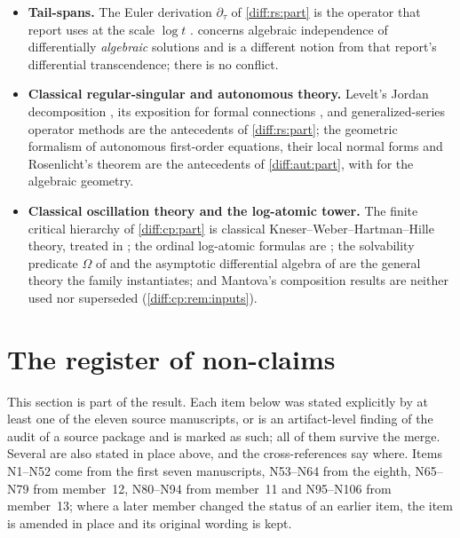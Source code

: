 \documentclass[11pt,letterpaper]{article}
\numberwithin{equation}{section}
\theoremstyle{definition}
\theoremstyle{remark}
\newcommand{\SC}{\mathbf{No}[i]}
\newcommand{\der}{\partial}
\newcommand{\derT}{\der_{\tau}}
\begin{document}
\begin{itemize}[leftmargin=1.6em]
nonnegative valuation of $j$ need formal groups around a good-reduction model
\cite{RepoTate}, and it makes no assertion about the Berarducci--Mantova
derivation.  treats constant good-reduction
abelian varieties over $\SC$ by their formal groups, and
\cref{diff:aut:thm:abelianimage} is the collection's first contact between
surreal derivations and abelian varieties; it is a cross-link, not an answer to
that report's question over Hahn fields with a coarse valuation
(\cref{diff:aut:rem:tate}).
\item \textbf{Tail-spans.} The Euler derivation $\derT$ of \cref{diff:rs:part} is
the operator that report uses at the scale $\log t$ \cite{RepoTailSpans}.
 concerns algebraic independence of
differentially \emph{algebraic} solutions and is a different notion from that
report's differential transcendence; there is no conflict.
\item \textbf{Classical regular-singular and autonomous theory.} Levelt's Jordan
decomposition \cite{Levelt}, its exposition for formal connections \cite{KW}, and
generalized-series operator methods \cite{vdH} are the antecedents of
\cref{diff:rs:part}; the geometric formalism of autonomous first-order equations,
their local normal forms and Rosenlicht's theorem \cite{NPT} are the antecedents
of \cref{diff:aut:part}, with \cite{Milne,Stacks} for the algebraic geometry.
\item \textbf{Classical oscillation theory and the log-atomic tower.} The
finite critical hierarchy of \cref{diff:cp:part} is classical
Kneser--Weber--Hartman--Hille theory, treated in \cite{KT}; the ordinal
log-atomic formulas are \cite[Section~2]{ADH}; the solvability predicate
$\Omega$ of \cite[p.~17]{ADH} and the asymptotic differential algebra of
\cite{ADHBook} are the general theory the family instantiates; and Mantova's
composition results \cite{Mantova2026} are neither used nor superseded
(\cref{diff:cp:rem:inputs}).
\end{itemize}

\section{The register of non-claims}
\label{diff:sec:nonclaims}

This section is part of the result. Each item below was stated explicitly by
at least one of the eleven source manuscripts, or is an artifact-level finding of
the audit of a source package and is marked as such; all of them survive the
merge. Several are also stated in place above, and the cross-references say
where. Items N1--N52 come from the first seven manuscripts, N53--N64 from the
eighth, N65--N79 from member~12, N80--N94 from member~11 and N95--N106 from
member~13; where a later
member changed the status of an earlier item, the item is amended in place and
its original wording is kept.
\end{document}
